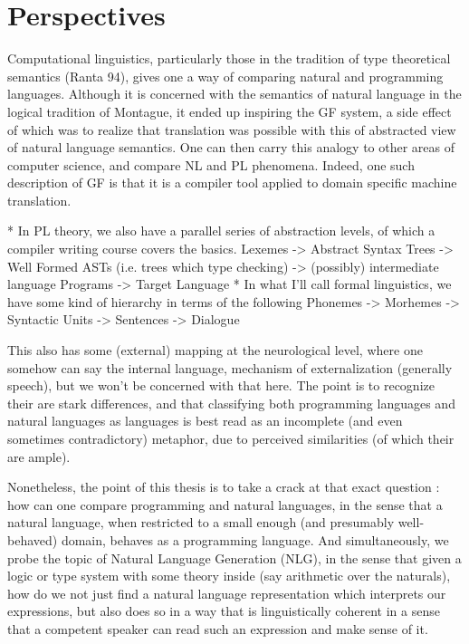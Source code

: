 \section{Perspectives}


Computational linguistics, particularly those in the tradition of type
theoretical semantics (Ranta 94), gives one a way of comparing natural and
programming languages. Although it is concerned with the semantics of natural
language in the logical tradition of Montague, it ended up inspiring the GF
system, a side effect of which was to realize that translation was possible with
this of abstracted view of natural language semantics. One can then carry this
analogy to other areas of computer science, and compare NL and PL phenomena.
Indeed, one such description of GF is that it is a compiler tool applied to
domain specific machine translation.

* In PL theory, we also have a parallel series of abstraction levels, of which a
compiler writing course covers the basics. Lexemes -> Abstract Syntax Trees ->
Well Formed ASTs (i.e. trees which type checking) -> (possibly) intermediate
language Programs -> Target Language * In what I'll call formal linguistics, we
have some kind of hierarchy in terms of the following Phonemes -> Morhemes ->
Syntactic Units -> Sentences -> Dialogue

This also has some (external) mapping at the neurological level, where one
somehow can say the internal language, mechanism of externalization (generally
speech), but we won't be concerned with that here. The point is to recognize
their are stark differences, and that classifying both programming languages and
natural languages as languages is best read as an incomplete (and even sometimes
contradictory) metaphor, due to perceived similarities (of which their are
ample).

Nonetheless, the point of this thesis is to take a crack at that exact question
: how can one compare programming and natural languages, in the sense that a
natural language, when restricted to a small enough (and presumably
well-behaved) domain, behaves as a programming language. And simultaneously, we
probe the topic of Natural Language Generation (NLG), in the sense that given a
logic or type system with some theory inside (say arithmetic over the naturals),
how do we not just find a natural language representation which interprets our
expressions, but also does so in a way that is linguistically coherent in a
sense that a competent speaker can read such an expression and make sense of it.

